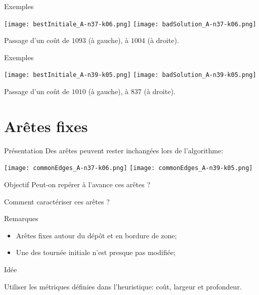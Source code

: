 \documentclass{beamer}
\begin{document}
\begin{frame}{Exemples}
\begin{center}
\texttt{[image: bestInitiale\_A-n37-k06.png]}
\texttt{[image: badSolution\_A-n37-k06.png]}
\end{center}
Passage d'un coût de $1093$ (à gauche), à $1004$ (à droite).
\end{frame}

\begin{frame}{Exemples}
\begin{center}
\texttt{[image: bestInitiale\_A-n39-k05.png]}
\texttt{[image: badSolution\_A-n39-k05.png]}
\end{center}
Passage d'un coût de $1010$ (à gauche), à $837$ (à droite).
\end{frame}

\section{Arêtes fixes}

\begin{frame}{Présentation}
Des arêtes peuvent rester inchangées lors de l'algorithme:

\begin{center}
\texttt{[image: commonEdges\_A-n37-k06.png]}
\texttt{[image: commonEdges\_A-n39-k05.png]}
\end{center}
\begin{block}{Objectif}
Peut-on repérer à l'avance ces arêtes ?
\end{block}

\end{frame}

\begin{frame}{Comment caractériser ces arêtes ?}
\begin{block}{Remarques}
\begin{itemize}
\item Arêtes fixes autour du dépôt et en bordure de zone;
\item Une des tournée initiale n'est presque pas modifiée;
\end{itemize}
\end{block}

\begin{alertblock}{Idée}

Utiliser les métriques définies dans l'heuristique: coût, largeur et profondeur.

\end{alertblock}
\end{frame}
\end{document}
